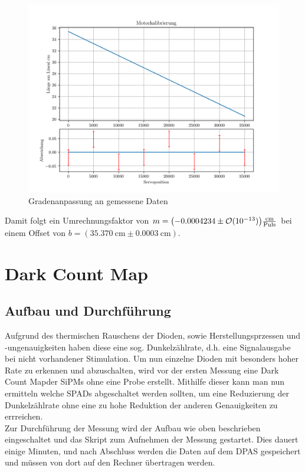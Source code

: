 \documentclass[12pt,twoside,a4paper]{scrartcl}
\begin{document}
			\begin{figure}[H]
				\centering
					\includegraphics[width=\textwidth]{Plots/WegKalib.png}
				\caption{Gradenanpassung an gemessene Daten}
			\end{figure}

			Damit folgt ein Umrechnungsfaktor von $m = \qty(-0.0004234 \pm \mathcal{O}(10^{-13})) \frac{\si{\centi \metre}}{\text{Puls}}$ bei einem Offset von $b = (\SI{35.370}{\centi \metre} \pm \SI{0.0003}{\centi \metre})$.


	\section{Dark Count Map}
	\label{DCM}

		\subsection{Aufbau und Durchführung}

			Aufgrund des thermischen Rauschens der Dioden, sowie Herstellungsprzessen und -ungenauigkeiten haben diese eine sog. \glqq Dunkelzählrate\grqq, d.h. eine Signalausgabe bei nicht vorhandener Stimulation. Um nun einzelne Dioden mit besonders hoher Rate zu erkennen und abzuschalten, wird vor der ersten Messung eine \glqq Dark Count Map\grqq der SiPMs ohne eine Probe erstellt. Mithilfe dieser kann man nun ermitteln welche SPADs abgeschaltet werden sollten, um eine Reduzierung der Dunkelzählrate ohne eine zu hohe Reduktion der anderen Genauigkeiten zu errreichen.\\
			Zur Durchführung der Messung wird der Aufbau wie oben beschrieben eingeschaltet und das Skript zum Aufnehmen der Messung gestartet. Dies dauert einige Minuten, und nach Abschluss werden die Daten auf dem DPAS gespeichert und müssen von dort auf den Rechner übertragen werden.
\end{document}

